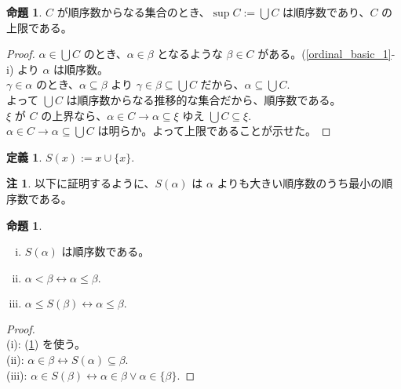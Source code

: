 \documentclass{jsarticle}
\theoremstyle{definition}
\newtheorem*{definition*}{定義}
\newtheorem{proposition}[theorem]{命題}
\newtheorem{remark}{注}[section]
\begin{document}
    \begin{proposition} \label{ordinal_basic_4} $C$ が順序数からなる集合のとき、$\sup C := \bigcup C$ は順序数であり、$C$ の上限である。
    \end{proposition}
    \begin{proof}
        $\alpha \in \bigcup C$ のとき、$\alpha \in \beta$ となるような $\beta \in C$ がある。(\ref{ordinal_basic_1}-i) より $\alpha$ は順序数。\\
        $\gamma \in \alpha$ のとき、$\alpha \subseteq \beta$ より $\gamma \in \beta \subseteq \bigcup C$ だから、$\alpha \subseteq \bigcup C.$\\
        よって $\bigcup C$ は順序数からなる推移的な集合だから、順序数である。\\
        $\xi$ が $C$ の上界なら、$\alpha \in C \rightarrow \alpha \subseteq \xi$ ゆえ $\bigcup C \subseteq \xi.$ \\
        $\alpha \in C \rightarrow \alpha \subseteq \bigcup C$ は明らか。よって上限であることが示せた。 
    \end{proof}
    \vspace{1ex}
    
    \begin{definition*} \label{successor} $S(x) := x \cup \{x\}.$
    \end{definition*}
    \begin{remark}
        以下に証明するように、$S(\alpha)$ は $\alpha$ よりも大きい順序数のうち最小の順序数である。
    \end{remark}
    
    \begin{proposition} \label{ordinal_basic_5} \
        \begin{enumerate}[(i)]
            \item $S(\alpha)$ は順序数である。
            \item $\alpha < \beta \leftrightarrow \alpha \leq \beta.$
            \item $\alpha \leq S(\beta) \leftrightarrow \alpha \leq \beta.$
        \end{enumerate} 
    \end{proposition}
    \begin{proof} \ \\
        (i): (\ref{ordinal_basic_4}) を使う。\\
        (ii): $\alpha \in \beta \leftrightarrow S(\alpha) \subseteq \beta.$\\
        (iii): $\alpha \in S(\beta) \leftrightarrow \alpha \in \beta \lor \alpha \in \{\beta\}.$
    \end{proof}
    \vspace{0.5ex}
    
\end{document}
